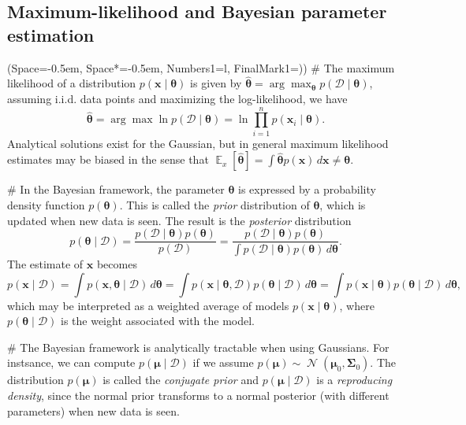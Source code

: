\documentclass[12pt, a4paper]{article}
\newcommand{\listSpace}{-0.5em}%
\newcommand{\D}{\mathcal{D}}
\newcommand{\vect}[1]{\bm{#1}}
\DeclareMathOperator{\N}{\mathcal{N}}
\DeclareMathOperator{\E}{\mathbb{E}}
\begin{document}
\subsection{Maximum-likelihood and Bayesian parameter estimation}
\begin{easylist}[itemize]
\ListProperties(Space=\listSpace, Space*=\listSpace, Numbers1=l, FinalMark1={)})
# The maximum likelihood of a distribution $p(\vect{x} \mid \vect{\theta})$ is given by $\hat{\vect{\theta}} = \arg \max_{\vect{\theta}} p(\D \mid \vect{\theta})$,
assuming i.i.d. data points and maximizing the log-likelihood, we have
\begin{equation*}
	\hat{\vect{\theta}} = \arg \max \ln  p(\D \mid \vect{\theta}) = \ln  \prod_{i=1}^{n} p(\vect{x}_i \mid \vect{\theta})  .
\end{equation*}
Analytical solutions exist for the Gaussian, but in general maximum likelihood estimates may be biased in the sense that $\E_x[ \hat{\vect{\theta}} ] = \int \hat{\vect{\theta}} p(\vect{x}) \, d\vect{x} \neq \vect{\theta}$.

# In the Bayesian framework, the parameter $\vect{\theta}$ is expressed by a probability density function $p(\vect{\theta})$.
This is called the \emph{prior} distribution of $\vect{\theta}$, which is updated when new data is seen.
The result is the \emph{posterior} distribution
\begin{equation*}
	p(\vect{\theta} \mid \D)  
	= 
	\frac{p(\D \mid \vect{\theta}) p (\vect{\theta})}
	{p(\D)}
	= 
	\frac{p(\D \mid \vect{\theta}) p (\vect{\theta})}
	{\int p(\D \mid \vect{\theta}) p(\vect{\theta}) \, d \vect{\theta}}.
\end{equation*}
The estimate of $\vect{x}$ becomes
\begin{equation*}
	p(\vect{x} \mid \D) = \int p(\vect{x}, \vect{\theta} \mid \D) \, d\vect{\theta} =
	\int p(\vect{x} \mid \vect{\theta} , \D) p(\vect{\theta} \mid \D)  \, d\vect{\theta} =
	\int p(\vect{x} \mid \vect{\theta}) p(\vect{\theta} \mid \D)  \, d\vect{\theta},
\end{equation*}
which may be interpreted as a weighted average of models $p(\vect{x} \mid \vect{\theta})$, where $p(\vect{\theta} \mid \D)$ is the weight associated with the model.

# The Bayesian framework is analytically tractable when using Gaussians.
For instsance, we can compute $p(\vect{\mu} \mid \D)$ if we assume $p(\vect{\mu}) \sim \N(\vect{\mu}_0, \vect{\Sigma}_0)$.
The distribution $p(\vect{\mu})$ is called the \emph{conjugate prior} and $p(\vect{\mu} \mid \D)$ is a \emph{reproducing density}, since the normal prior transforms to a normal posterior (with different parameters) when new data is seen.


\end{easylist}
\end{document}
